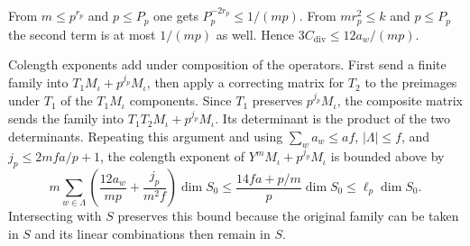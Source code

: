 From \(m\le p^{r_p}\) and \(p\le P_p\) one gets
\(P_p^{-2r_p}\le1/(mp)\). From \(mr_p^2\le k\) and \(p\le P_p\) the
second term is at most \(1/(mp)\) as well.
Hence \(3C_{\mathrm{div}}\le12a_w/(mp)\).

Colength exponents add under composition of the operators.
First send a finite family into \(T_1M_\iota+p^{j_p}M_\iota\), then apply
a correcting matrix for \(T_2\) to the preimages under \(T_1\) of the
\(T_1M_\iota\) components. Since \(T_1\) preserves \(p^{j_p}M_\iota\),
the composite matrix sends the family into
\(T_1T_2M_\iota+p^{j_p}M_\iota\). Its determinant is the product of the
two determinants. Repeating this argument and using
\(\sum_w a_w\le af\), \(|\Lambda|\le f\), and \(j_p\le2mfa/p+1\), the
colength exponent of \(Y^mM_\iota+p^{j_p}M_\iota\) is bounded above by
\[
  m\sum_{w\in\Lambda}
      \left(\frac{12a_w}{mp}+\frac{j_p}{m^2f}\right)\dim S_0
    \le \frac{14fa+p/m}{p}\dim S_0
    \le \ell_p\dim S_0 .
\]
Intersecting with \(S\) preserves this bound because the original family
can be taken in \(S\) and its linear combinations then remain in \(S\).

